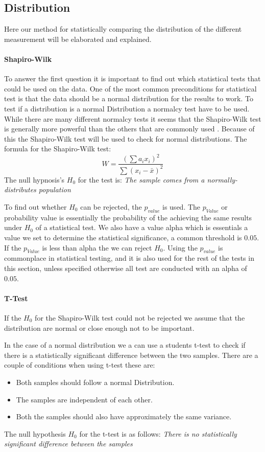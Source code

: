 \subsection{Distribution}
Here our method for statistically comparing the distribution of the different measurement will be elaborated and explained.
\paragraph{Shapiro-Wilk}
To answer the first question it is important to find out which statistical tests that could be used on the data. One of the most common preconditions for statistical test is that the data should be a normal distribution for the results to work. To test if a distribution is a normal Distribution a normalcy test have to be used. While there are many different normalcy tests it seems that the Shapiro-Wilk test is generally more powerful than the others that are commonly used \cite{razali2011power}. Because of this the Shapiro-Wilk test will be used to check for normal distributions. The formula for the Shapiro-Wilk test:
$$W=\frac{( \sum{a_i x_i} )^2}{\sum{(x_i - \bar{x})^2}}$$
The null hypnosis's $H_0$ for the test is:
\textit{The sample comes from a normally-distributes population}

To find out whether $H_0$ can be rejected, the $p_{value}$ is used. The $p_{Value}$ or probability value is essentially the probability of the achieving the same results under $H_0$ of a statistical test. We also have a value alpha which is essentials a value we set to determine the statistical significance, a common threshold is $0.05$. If the $p_{Value}$ is less than alpha the we can reject $H_0$. Using the $p_{value}$ is commonplace in statistical testing, and it is also used for the rest of the tests in this section, unless specified otherwise all test are conducted with an alpha of $0.05$.
\paragraph{T-Test}
If the $H_0$ for the Shapiro-Wilk test could not be rejected we assume that the distribution are normal or close enough not to be important.

In the case of a normal distribution we a can use a students t-test to check if there is a statistically significant difference between the two samples. There are a couple of conditions when using t-test these are:
\begin{itemize}
    \item Both samples should follow a normal Distribution.
    \item The samples are independent of each other.
    \item Both the samples should also have approximately the same variance.
\end{itemize}
The null hypothesis $H_0$ for the t-test is as follows: \textit{There is no statistically significant difference between the samples}

